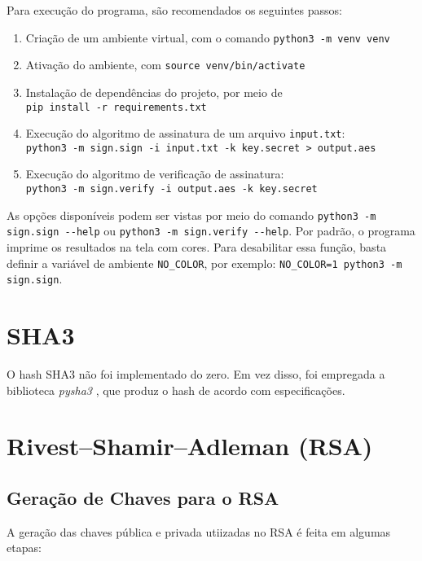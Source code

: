 \documentclass[a4paper, 10.5pt]{article}
\begin{document}
    Para execução do programa, são recomendados os seguintes passos:
    \begin{enumerate}
        \item Criação de um ambiente virtual, com o comando \verb|python3 -m venv venv|
        \item Ativação do ambiente, com \verb|source venv/bin/activate|
        \item Instalação de dependências do projeto, por meio de \\ \verb|pip install -r requirements.txt|
        \item Execução do algoritmo de assinatura de um arquivo
            \verb|input.txt|: \\ \verb|python3 -m sign.sign -i input.txt -k key.secret > output.aes|
        \item Execução do algoritmo de verificação de assinatura: \\
            \verb|python3 -m sign.verify -i output.aes -k key.secret|
    \end{enumerate}

    As opções disponíveis podem ser vistas por meio do comando \verb|python3 -m sign.sign --help| ou \verb|python3 -m sign.verify --help|.
    Por padrão, o programa imprime os resultados na tela com cores. Para
    desabilitar essa função, basta definir a variável de ambiente
    \verb|NO_COLOR|, por exemplo: \verb|NO_COLOR=1 python3 -m sign.sign|.


\section{SHA3} %
\label{sec:sha3}
O hash SHA3 não foi implementado do zero. Em vez disso, foi empregada a biblioteca
\textit{pysha3} \citep{pysha3}, que produz o hash de acordo com especificações.

\section{Rivest–Shamir–Adleman (RSA)} %

\subsection{Geração de Chaves para o RSA} %
A geração das chaves pública e privada utiizadas no RSA é feita em algumas etapas:
\end{document}
